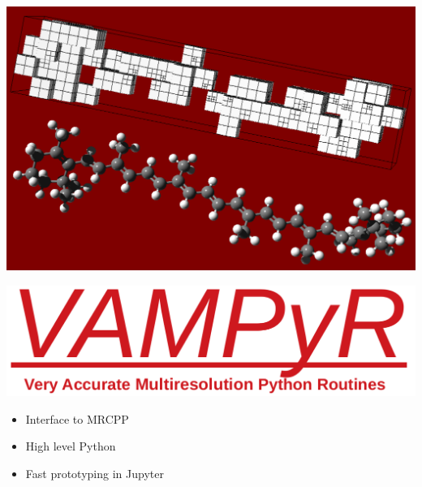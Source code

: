 \begin{frame}
\begin{columns}
\begin{column}[b]{0.40\linewidth}
\centering
\includegraphics[scale=0.12]{figures/carotene_grid.pdf}\\

\vspace{12mm}

\includegraphics[scale=0.1]{figures/vampyr.png}
\begin{itemize}
    \item Interface to MRCPP
    \item High level Python
    \item Fast prototyping in Jupyter
\end{itemize}
\end{column}
\end{columns}

\end{frame}


